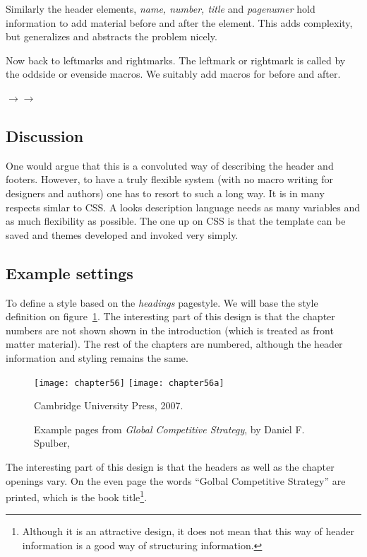 Similarly the header elements, \textit{name, number, title} and \textit{pagenumer}  hold information to add material before and after the element. This adds complexity, but generalizes and abstracts the problem nicely.

Now back to leftmarks and rightmarks. The leftmark or rightmark is called by the oddside or evenside macros. We suitably add macros for before and after.

$\rightarrow$$\rightarrow$

\subsection{Discussion}

One would argue that this is a convoluted way of describing the header and footers. However, to have a truly flexible system (with no macro writing for designers and authors) one has to resort to such a long way. It is in many respects simlar to CSS. A looks description language needs as many variables and as much flexibility as possible. The one up on CSS is that the template can be saved and themes developed and invoked very simply.

\subsection{Example settings}
To define a style based on the \textit{headings} pagestyle. We will base the style definition on figure~\ref{globalstrategy}. The interesting part of this design is that the chapter numbers are not shown shown in the introduction (which is treated as front matter material). The rest of the chapters are numbered, although the header information and styling remains the same.

\begin{figure}[hp]
\centering
\texttt{[image: chapter56]}\vspace{0.5\baselineskip}
\texttt{[image: chapter56a]}
\caption{Example pages from \textit{Global Competitive Strategy}, by Daniel F. Spulber,} Cambridge University Press, 2007.
\label{globalstrategy}
\end{figure}

The interesting part of this design is that the headers as well as the chapter openings vary. On the even page the words ``Golbal Competitive Strategy'' are printed, which is the book title\footnote{Although it is an attractive design, it does not mean that this way of header information is a good way of structuring information.}.

